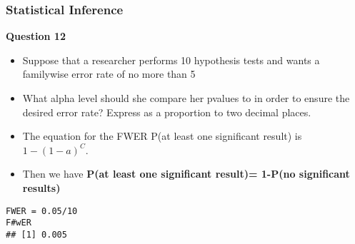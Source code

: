 \begin{frame}[fragile]
\frametitle{Statistical Inference}
\textbf{Question 12}

\begin{itemize}
\item Suppose that a researcher performs 10 hypothesis tests and wants a familywise error rate of no more than 5%
\item What alpha level should she compare her pvalues to in order to ensure the desired error rate? Express as a proportion to two decimal places. 
\item The equation for the FWER P(at least one significant result) is \( 1-(1-a)^C \). 
\item Then we have \textbf{P(at least one significant result)= 1-P(no significant results)}
\end{itemize}

\begin{framed}
\begin{verbatim}
FWER = 0.05/10
F#wER
## [1] 0.005
\end{verbatim}
\end{framed}
\end{frame}

